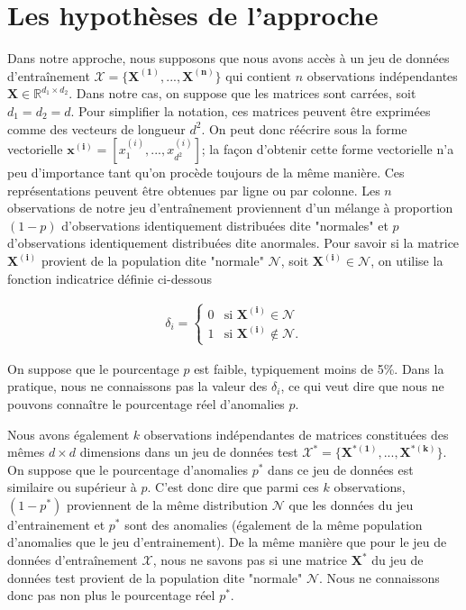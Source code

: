 \section{Les hypothèses de l'approche}

Dans notre approche, nous supposons que  nous avons accès à un jeu de données d'entraînement $\mathcal{X} = \{\boldsymbol{X^{(1)}}, ..., \boldsymbol{X^{(n)}}\}$ qui contient $n$ observations indépendantes $\mathbf{X} \in \mathbb{R}^{d_1 \times d_2}$. Dans notre cas, on suppose que les matrices sont carrées, soit $d_1=d_2=d$. Pour simplifier la notation, ces matrices peuvent être exprimées comme des vecteurs de longueur $d^2$. On peut donc réécrire sous la forme vectorielle $\boldsymbol{x^{(i)}} = [x^{(i)}_1,...,x^{(i)}_{d^2}]$; la façon d'obtenir cette forme vectorielle n'a peu d'importance tant qu'on procède toujours de la même manière. Ces représentations peuvent être obtenues par ligne ou par colonne. Les $n$ observations de notre jeu d'entraînement proviennent d'un mélange à proportion $(1-p)$ d'observations identiquement distribuées dite "normales" et $p$ d'observations identiquement distribuées dite anormales. Pour savoir si la matrice $\boldsymbol{X^{(i)}}$ provient de la population dite "normale" $\mathcal{N}$, soit $ \boldsymbol{X^{(i)}}\in\mathcal{N}$, on utilise la fonction indicatrice définie ci-dessous

\begin{gather}  \label{eq:ind_anomaly}
\delta_{i}=
\begin{cases}
0 & \text{si $\boldsymbol{X^{(i)}}\in\mathcal{N}$} \\
1 & \text{si $\boldsymbol{X^{(i)}}\not\in\mathcal{N}$}.
\end{cases}
\end{gather}

On suppose que le pourcentage $p$ est faible, typiquement moins de 5\%. Dans la pratique, nous ne connaissons pas la valeur des $\delta_i$, ce qui veut dire que nous ne pouvons connaître le pourcentage réel d'anomalies $p$. 

Nous avons également $k$ observations indépendantes de matrices constituées des mêmes $d \times d$ dimensions dans un jeu de données test $\mathcal{X^*} = \{\boldsymbol{X^{*(1)}},...,\boldsymbol{X^{*(k)}}\}$. On suppose que le pourcentage d'anomalies $p^*$ dans ce jeu de données est similaire ou supérieur à $p$. C'est donc dire que parmi ces $k$ observations, $(1-p^*)$ proviennent de la même distribution $\mathcal{N}$ que les données du jeu d'entrainement et $p^*$ sont des anomalies (également de la même population d'anomalies que le jeu d'entrainement). De la même manière que pour le jeu de données d'entraînement $\mathcal{X}$, nous ne savons pas si une matrice $\boldsymbol{X^{*}}$ du jeu de données test provient de la population dite "normale" $\mathcal{N}$. Nous ne connaissons donc pas non plus le pourcentage réel $p^*$.


